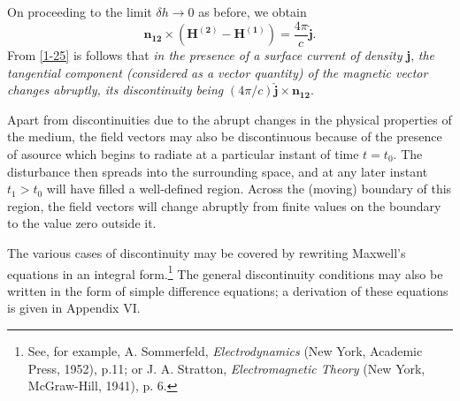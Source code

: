 \documentclass[lang=en,11pt]{elegantbook}
\begin{document}
	On proceeding to the limit $\delta h\rightarrow0$ as before, we obtain
	\begin{equation}
		\mathbf{n_{12}}\times(\mathbf{H^{(2)}}-\mathbf{H^{(1)}})=\frac{4\pi}{c}\mathbf{\hat{j}}.
		\label{1-25}
	\end{equation}
	From \eqref{1-25} is follows that \textit{in the presence of a surface current of density} \textbf{j}, \textit{the	tangential component (considered as a vector quantity) of the magnetic vector changes	abruptly, its discontinuity being} $(4\pi/c)\mathbf{\hat{j}}\times\mathbf{n_{12}}$.\par 	Apart from discontinuities due to the abrupt changes in the physical properties of	the medium, the field vectors may also be discontinuous because of the presence of asource which begins to radiate at a particular instant of time $t=t_0$. The disturbance then spreads into the surrounding space, and at any later instant $t_1>t_0$ will have filled a well-defined region. Across the (moving) boundary of this region, the field vectors	will change abruptly from finite values on the boundary to the value zero outside it.\par 
	The various cases of discontinuity may be covered by rewriting Maxwell's equations	in an integral form.\footnote{See, for example, A. Sommerfeld, \textit{Electrodynamics} (New York, Academic Press, 1952), p.11; or J. A.	Stratton, \textit{Electromagnetic Theory} (New York, McGraw-Hill, 1941), p. 6.} The general discontinuity conditions may also be written in the form of simple difference equations; a derivation of these equations is given in	Appendix VI.
	
\end{document}
